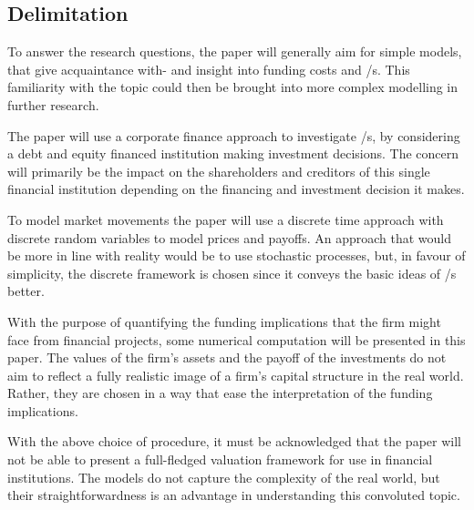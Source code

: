 \documentclass[main.tex]{subfiles}
\begin{document}
    \subsection{Delimitation}

    To answer the research questions, the paper will generally aim for simple models,
    that give acquaintance with- and insight into funding costs and \FVA/s.
    This familiarity with the topic could then be brought into more complex modelling
    in further research.

    The paper will use a corporate finance approach to investigate \FVA/s,
    by considering a debt and equity financed institution making investment decisions.
    The concern will primarily be the impact on the shareholders and creditors 
    of this single financial institution depending on the financing and investment decision it makes.

    To model market movements the paper will use a discrete time approach 
    with discrete random variables to model prices and payoffs.
    An approach that would be more in line with reality would be to use stochastic processes,
    but, in favour of simplicity, the discrete framework is chosen 
    since it conveys the basic ideas of \FVA/s better.

    With the purpose of quantifying the funding implications that the firm might face from financial projects,
    some numerical computation will be presented in this paper.
    The values of the firm's assets and the payoff of the investments
    do not aim to reflect a fully realistic image of a firm's capital structure in the real world.
    Rather, they are chosen in a way that ease the interpretation of the funding implications.

    With the above choice of procedure, it must be acknowledged that the paper will not be able to
    present a full-fledged valuation framework for use in financial institutions.
    The models do not capture the complexity of the real world,
    but their straightforwardness is an advantage in understanding this convoluted topic.
\end{document}
